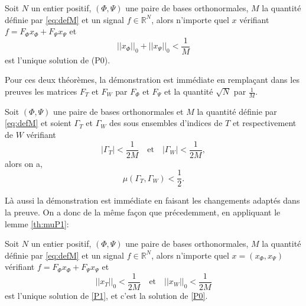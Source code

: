 	\begin{theoreme}\label{th:IncertGen2}
		Soit $N$ un entier positif, $(\Phi,\Psi)$ une paire de bases orthonormales, $M$ la quantité définie par \ref{eq:defM} et un signal $f \in \mathbb{R}^N$, alors n'importe quel $x$ vérifiant $f = F_\Phi x_\Phi + F_\Psi x_\Psi$ et 
		\begin{equation}\label{eq:Incert1}
			||x_\Phi||_0 + ||x_\Psi||_0 < \frac{1}{M}
		\end{equation}
		est l'unique solution de (P0).
	\end{theoreme}
	Pour ces deux théorèmes, la démonstration est immédiate en remplaçant dans les preuves les matrices $F_T$ et $F_W$ par $F_\Phi$ et $F_\Psi$ et la quantité $\sqrt{N}$ par $\frac{1}{M}$.
	\begin{lemme}\label{th:muFDGen}
		Soit $(\Phi,\Psi)$ une paire de bases orthonormales et $M$ la quantité définie par \ref{eq:defM} et soient $\Gamma_T$  et $\Gamma_W$ des sous ensembles d'indices de $T$ et respectivement de $W$ vérifiant
		\begin{equation}
			|\Gamma_T| < \frac{1}{2M} \quad \text{et} \quad |\Gamma_W| < \frac{1}{2M},
		\end{equation}
		alors on a,
		\begin{equation}
			\mu(\Gamma_T, \Gamma_W) < \frac{1}{2}.
		\end{equation}
	\end{lemme}
	Là aussi la démonstration est immédiate en faisant les changements adaptés dans la preuve.
	On a donc de la même façon que précedemment, en appliquant le lemme \ref{th:muP1}:
	\begin{theoreme}\label{th:recovgen}
		Soit $N$ un entier positif, $(\Phi, \Psi)$ une paire de bases orthonormales, $M$ la quantité définie par \ref{eq:defM} et un signal $f\in \mathbb{R}^N$, alors n'importe quel $x = (x_\Phi, x_\Psi)$ vérifiant $f = F_\Phi x_\Phi + F_\Psi x_\Psi$ et
	\begin{equation}\label{eq:cond1}
		||x_T||_0 < \frac{1}{2M} \quad \text{et} \quad   ||x_W||_0 < \frac{1}{2M}
	\end{equation}
	est l'unique solution de \ref{P1}, et c'est la solution de \ref{P0}.
\end{theoreme}

